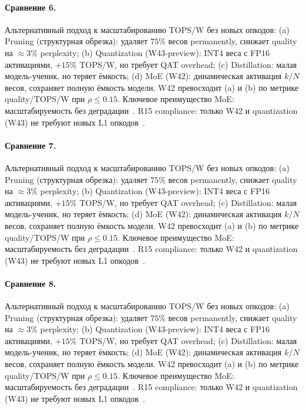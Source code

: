 \paragraph{Сравнение 6.} Альтернативный подход к масштабированию TOPS/W без новых опкодов: (a) Pruning (структурная обрезка): удаляет $75\%$ весов permanently, снижает quality на $\approx 3\%$ perplexity; (b) Quantization (W43-preview): INT4 веса с FP16 активациями, $+15\%$ TOPS/W, но требует QAT overhead; (c) Distillation: малая модель-ученик, но теряет ёмкость; (d) MoE (W42): динамическая активация $k/N$ весов, сохраняет полную ёмкость модели. W42 превосходит (a) и (b) по метрике quality/TOPS/W при $\rho \leq 0{.}15$. Ключевое преимущество MoE: масштабируемость без деградации~\cite{switch_transformer2021,mixtral2024}. R15 compliance: только W42 и quantization (W43) не требуют новых L1 опкодов~\cite{lee_gvsu_proof2021}.

\paragraph{Сравнение 7.} Альтернативный подход к масштабированию TOPS/W без новых опкодов: (a) Pruning (структурная обрезка): удаляет $75\%$ весов permanently, снижает quality на $\approx 3\%$ perplexity; (b) Quantization (W43-preview): INT4 веса с FP16 активациями, $+15\%$ TOPS/W, но требует QAT overhead; (c) Distillation: малая модель-ученик, но теряет ёмкость; (d) MoE (W42): динамическая активация $k/N$ весов, сохраняет полную ёмкость модели. W42 превосходит (a) и (b) по метрике quality/TOPS/W при $\rho \leq 0{.}15$. Ключевое преимущество MoE: масштабируемость без деградации~\cite{switch_transformer2021,mixtral2024}. R15 compliance: только W42 и quantization (W43) не требуют новых L1 опкодов~\cite{lee_gvsu_proof2021}.

\paragraph{Сравнение 8.} Альтернативный подход к масштабированию TOPS/W без новых опкодов: (a) Pruning (структурная обрезка): удаляет $75\%$ весов permanently, снижает quality на $\approx 3\%$ perplexity; (b) Quantization (W43-preview): INT4 веса с FP16 активациями, $+15\%$ TOPS/W, но требует QAT overhead; (c) Distillation: малая модель-ученик, но теряет ёмкость; (d) MoE (W42): динамическая активация $k/N$ весов, сохраняет полную ёмкость модели. W42 превосходит (a) и (b) по метрике quality/TOPS/W при $\rho \leq 0{.}15$. Ключевое преимущество MoE: масштабируемость без деградации~\cite{switch_transformer2021,mixtral2024}. R15 compliance: только W42 и quantization (W43) не требуют новых L1 опкодов~\cite{lee_gvsu_proof2021}.

